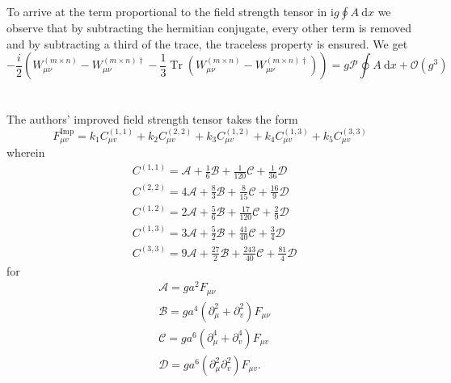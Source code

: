 \documentclass[a4paper,10pt]{article}
\begin{document}
To arrive at the term proportional to the field strength tensor in $\mathrm{i} g \oint A \mathrm{~d} x$ we observe that by subtracting the hermitian conjugate, every other term is removed and by subtracting a third of the trace, the traceless property is ensured. We get
\begin{equation}\label{eq:cloverToFST}
-\frac{i}{2}\left( W_{\mu \nu}^{(m \times n)}- W_{\mu \nu}^{(m \times n)\dagger} - \frac{1}{3}\operatorname{Tr}\left( W_{\mu \nu}^{(m \times n)}- W_{\mu \nu}^{(m \times n)\dagger} \right)  \right) = g \mathscr{P} \oint A \mathrm{~d} x+\mathcal{O}\left(g^{3}\right)
\end{equation}
\\\\The authors' improved field strength tensor takes the form 
\begin{equation}\label{eq:Improved_lattice_field_strength_tensor}
F_{\mu v}^{\operatorname{Imp}}=k_{1} C_{\mu v}^{(1,1)}+k_{2} C_{\mu v}^{(2,2)}+k_{3} C_{\mu v}^{(1,2)}+k_{4} C_{\mu v}^{(1,3)}+k_{5} C_{\mu v}^{(3,3)}
\end{equation}
wherein 
\begin{equation}
\begin{aligned}
&C^{(1,1)}=\mathscr{A}+\frac{1}{6} \mathscr{B}+\frac{1}{120} \mathscr{C}+\frac{1}{36} \mathscr{D} \\
&C^{(2,2)}=4 \mathscr{A}+\frac{8}{3} \mathscr{B}+\frac{8}{15} \mathscr{C}+\frac{16}{9} \mathscr{D} \\
&C^{(1,2)}=2 \mathscr{A}+\frac{5}{6} \mathscr{B}+\frac{17}{120} \mathscr{C}+\frac{2}{9} \mathscr{D} \\
&C^{(1,3)}=3 \mathscr{A}+\frac{5}{2} \mathscr{B}+\frac{41}{40} \mathscr{C}+\frac{3}{4} \mathscr{D} \\
&C^{(3,3)}=9 \mathscr{A}+\frac{27}{2} \mathscr{B}+\frac{243}{40} \mathscr{C}+\frac{81}{4} \mathscr{D}
\end{aligned}
\end{equation}
for 
\begin{equation}
\begin{aligned}
&\mathscr{A}=g a^{2} F_{\mu \nu} \\
&\mathscr{B}=g a^{4}\left(\partial_{\mu}^{2}+\partial_{v}^{2}\right) F_{\mu \nu} \\
&\mathscr{C}=g a^{6}\left(\partial_{\mu}^{4}+\partial_{v}^{4}\right) F_{\mu v} \\
&\mathscr{D}=g a^{6}\left(\partial_{\mu}^{2} \partial_{v}^{2}\right) F_{\mu v}.
\end{aligned}
\end{equation}
\end{document}
